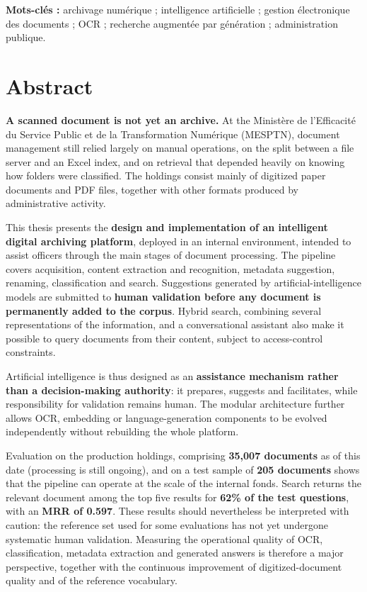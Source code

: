 \documentclass[12pt,a4paper]{report}
\newcommand{\nomMinistere}{Ministère de l'Efficacité du Service Public et de la Transformation Numérique (MESPTN)}
\begin{document}
\noindent\textbf{Mots-clés :} archivage numérique ; intelligence artificielle ; gestion électronique des documents ; OCR ; recherche augmentée par génération ; administration publique.
\endgroup
\clearpage

\chapter*{Abstract}
\begingroup
{}
\setlength{\parskip}{0.38em}
\vspace{-1.1em}
\textbf{A scanned document is not yet an archive.} At the \nomMinistere{}, document management still relied largely on manual operations, on the split between a file server and an Excel index, and on retrieval that depended heavily on knowing how folders were classified. The holdings consist mainly of digitized paper documents and PDF files, together with other formats produced by administrative activity.

This thesis presents the \textbf{design and implementation of an intelligent digital archiving platform}, deployed in an internal environment, intended to assist officers through the main stages of document processing. The pipeline covers acquisition, content extraction and recognition, metadata suggestion, renaming, classification and search. Suggestions generated by artificial-intelligence models are submitted to \textbf{human validation before any document is permanently added to the corpus}. Hybrid search, combining several representations of the information, and a conversational assistant also make it possible to query documents from their content, subject to access-control constraints.

Artificial intelligence is thus designed as an \textbf{assistance mechanism rather than a decision-making authority}: it prepares, suggests and facilitates, while responsibility for validation remains human. The modular architecture further allows OCR, embedding or language-generation components to be evolved independently without rebuilding the whole platform.

Evaluation on the production holdings, comprising \textbf{35,007 documents} as of this date (processing is still ongoing), and on a test sample of \textbf{205 documents} shows that the pipeline can operate at the scale of the internal fonds. Search returns the relevant document among the top five results for \textbf{62\% of the test questions}, with an \textbf{MRR of 0.597}. These results should nevertheless be interpreted with caution: the reference set used for some evaluations has not yet undergone systematic human validation. Measuring the operational quality of OCR, classification, metadata extraction and generated answers is therefore a major perspective, together with the continuous improvement of digitized-document quality and of the reference vocabulary.
\end{document}
